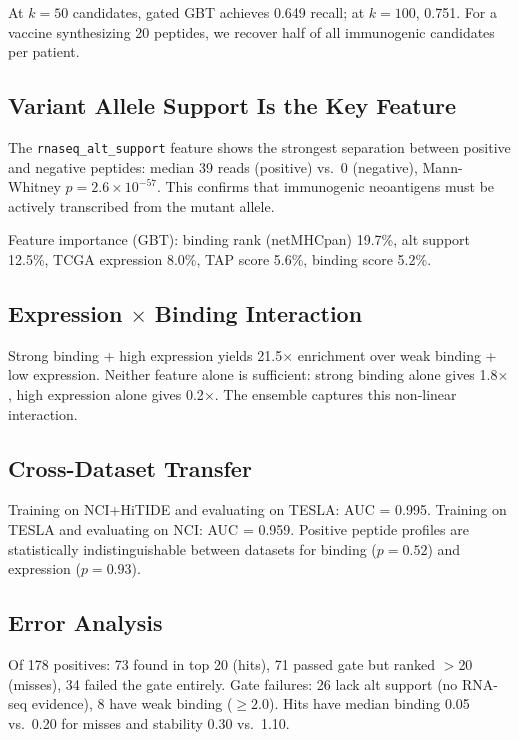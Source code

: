 \documentclass[11pt,twocolumn]{article}
\begin{document}
At $k=50$ candidates, gated GBT achieves 0.649 recall; at $k=100$, 0.751.
For a vaccine synthesizing 20 peptides, we recover half of all immunogenic
candidates per patient.

\subsection{Variant Allele Support Is the Key Feature}

The \texttt{rnaseq\_alt\_support} feature shows the strongest separation
between positive and negative peptides: median 39 reads (positive) vs.\
0 (negative), Mann-Whitney $p = 2.6 \times 10^{-57}$. This confirms that
immunogenic neoantigens must be actively transcribed from the mutant allele.

Feature importance (GBT): binding rank (netMHCpan) 19.7\%, alt support
12.5\%, TCGA expression 8.0\%, TAP score 5.6\%, binding score 5.2\%.

\subsection{Expression $\times$ Binding Interaction}

Strong binding + high expression yields 21.5$\times$ enrichment over
weak binding + low expression. Neither feature alone is sufficient:
strong binding alone gives 1.8$\times$, high expression alone gives
0.2$\times$. The ensemble captures this non-linear interaction.

\subsection{Cross-Dataset Transfer}

Training on NCI+HiTIDE and evaluating on TESLA: AUC = 0.995.
Training on TESLA and evaluating on NCI: AUC = 0.959.
Positive peptide profiles are statistically indistinguishable between
datasets for binding ($p = 0.52$) and expression ($p = 0.93$).

\subsection{Error Analysis}

Of 178 positives: 73 found in top 20 (hits), 71 passed gate but ranked
$>$20 (misses), 34 failed the gate entirely. Gate failures: 26 lack
alt support (no RNA-seq evidence), 8 have weak binding ($\geq 2.0$).
Hits have median binding 0.05 vs.\ 0.20 for misses and stability
0.30 vs.\ 1.10.
\end{document}
